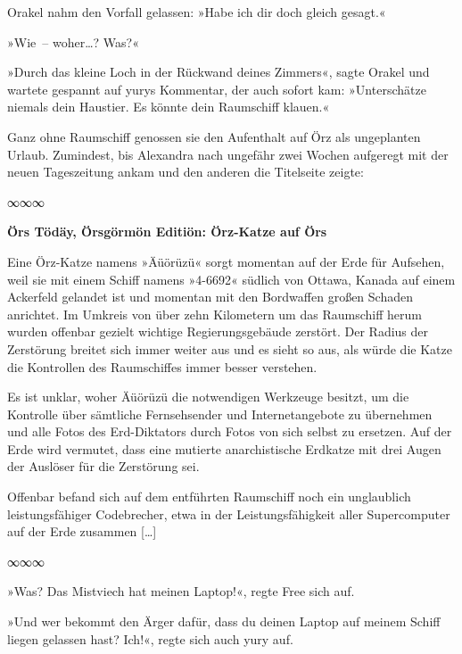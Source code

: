 Orakel nahm den Vorfall gelassen: »Habe ich dir doch gleich gesagt.«

»Wie~– woher…? Was?«

»Durch das kleine Loch in der Rückwand deines Zimmers«, sagte Orakel und wartete gespannt auf yurys Kommentar, der auch sofort kam: »Unterschätze niemals dein Haustier. Es könnte dein Raumschiff klauen.«

Ganz ohne Raumschiff genossen sie den Aufenthalt auf Örz als ungeplanten Urlaub. Zumindest, bis Alexandra nach ungefähr zwei Wochen aufgeregt mit der neuen Tageszeitung ankam und den anderen die Titelseite zeigte:

\begin{center}
    ∞∞∞
\end{center}

    \begin{itshape}

\textbf{Örs Tödäy, Örsgörmön Editiön: Örz-Katze auf Örs}

Eine Örz-Katze namens »Äüörüzü« sorgt momentan auf der Erde für Aufsehen, weil sie mit einem Schiff namens »4-6692« südlich von Ottawa, Kanada auf einem Ackerfeld gelandet ist und momentan mit den Bordwaffen großen Schaden anrichtet. Im Umkreis von über zehn Kilometern um das Raumschiff herum wurden offenbar gezielt wichtige Regierungsgebäude zerstört. Der Radius der Zerstörung breitet sich immer weiter aus und es sieht so aus, als würde die Katze die Kontrollen des Raumschiffes immer besser verstehen.

Es ist unklar, woher Äüörüzü die notwendigen Werkzeuge besitzt, um die Kontrolle über sämtliche Fernsehsender und Internetangebote zu übernehmen und alle Fotos des Erd-Diktators durch Fotos von sich selbst zu ersetzen. Auf der Erde wird vermutet, dass eine mutierte anarchistische Erdkatze mit drei Augen der Auslöser für die Zerstörung sei.

Offenbar befand sich auf dem entführten Raumschiff noch ein unglaublich leistungsfähiger Codebrecher, etwa in der Leistungsfähigkeit aller Supercomputer auf der Erde zusammen […]

    \end{itshape}

\begin{center}
    ∞∞∞
\end{center}

»Was? Das Mistviech hat meinen Laptop!«, regte Free sich auf.

»Und wer bekommt den Ärger dafür, dass du deinen Laptop auf meinem Schiff liegen gelassen hast? Ich!«, regte sich auch yury auf.


